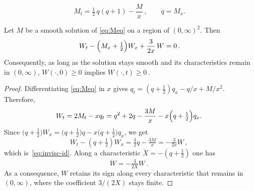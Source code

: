 \documentclass[10pt,a4paper]{amsart}
\begin{document}
\begin{equation}\label{eq:Meq}
	\,M_t=\tfrac12\,q(q+1)-\frac{M}{x}\,,
	\qquad q=M_x .
\end{equation}

\begin{lemma}\label{lem:inviscid}
	Let $M$ be a smooth solution of \eqref{eq:Meq} on a region of $(0,\infty)^2$.
	Then
	\begin{equation}\label{eq:invisc-id}
		\,W_t-\Bigl(M_x+\tfrac12\Bigr)W_x+\frac{3}{2x}\,W=0\,.
	\end{equation}
	Consequently, as long as the solution stays smooth and its characteristics
	remain in $(0,\infty)$,
	$W(\cdot,0)\ge0$ implies $W(\cdot,t)\ge0$\,.
\end{lemma}

\begin{proof}
	Differentiating \eqref{eq:Meq} in $x$ gives
	$q_t=(q+\tfrac12)q_x-q/x+M/x^2$.
	Therefore,
	\[
		W_t=2M_t-xq_t
		=q^2+2q-\frac{3M}{x}-x\Bigl(q+\tfrac12\Bigr)q_x .
	\]
	Since $\bigl(q+\tfrac12\bigr)W_x=\bigl(q+\tfrac12\bigr)q
		-x\bigl(q+\tfrac12\bigr)q_x$, we get
	\begin{equation*}
		W_t-(q+\tfrac12)W_x=\tfrac32 q-\tfrac{3M}{x}=-\tfrac{3}{2x}W \,,
	\end{equation*}
	which is~\eqref{eq:invisc-id}. Along a characteristic $\dot
		X=-(q+\tfrac12)$ one has
	\begin{equation*}
		\dot W=-\tfrac{3}{2X}W\,.
	\end{equation*}
	As a consequence, $W$ retains its sign along every characteristic that
	remains in $(0,\infty)$, where the coefficient $3/(2X)$ stays finite.
\end{proof}
\end{document}
